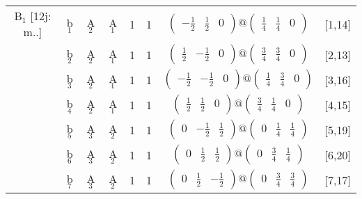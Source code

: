 \documentclass[fleqn,10pt,landscape]{article}
\begin{document}
\begin{itemize}
\begin{center}
\begin{longtable}{cc|cc|c|c|c|l}
B$_{1}$ [12j: m..] & b$_{1}$ & A$_{2}$ & A$_{1}$ & 1 & 1 & $\begin{pmatrix} - \frac{1}{2} & \frac{1}{2} & 0 \end{pmatrix}@\begin{pmatrix} \frac{1}{4} & \frac{1}{4} & 0 \end{pmatrix}$ & [1,14] \\
& b$_{2}$ & A$_{2}$ & A$_{1}$ & 1 & 1 & $\begin{pmatrix} \frac{1}{2} & - \frac{1}{2} & 0 \end{pmatrix}@\begin{pmatrix} \frac{3}{4} & \frac{3}{4} & 0 \end{pmatrix}$ & [2,13] \\
& b$_{3}$ & A$_{2}$ & A$_{1}$ & 1 & 1 & $\begin{pmatrix} - \frac{1}{2} & - \frac{1}{2} & 0 \end{pmatrix}@\begin{pmatrix} \frac{1}{4} & \frac{3}{4} & 0 \end{pmatrix}$ & [3,16] \\
& b$_{4}$ & A$_{2}$ & A$_{1}$ & 1 & 1 & $\begin{pmatrix} \frac{1}{2} & \frac{1}{2} & 0 \end{pmatrix}@\begin{pmatrix} \frac{3}{4} & \frac{1}{4} & 0 \end{pmatrix}$ & [4,15] \\
& b$_{5}$ & A$_{3}$ & A$_{2}$ & 1 & 1 & $\begin{pmatrix} 0 & - \frac{1}{2} & \frac{1}{2} \end{pmatrix}@\begin{pmatrix} 0 & \frac{1}{4} & \frac{1}{4} \end{pmatrix}$ & [5,19] \\
& b$_{6}$ & A$_{3}$ & A$_{2}$ & 1 & 1 & $\begin{pmatrix} 0 & \frac{1}{2} & \frac{1}{2} \end{pmatrix}@\begin{pmatrix} 0 & \frac{3}{4} & \frac{1}{4} \end{pmatrix}$ & [6,20] \\
& b$_{7}$ & A$_{3}$ & A$_{2}$ & 1 & 1 & $\begin{pmatrix} 0 & \frac{1}{2} & - \frac{1}{2} \end{pmatrix}@\begin{pmatrix} 0 & \frac{3}{4} & \frac{3}{4} \end{pmatrix}$ & [7,17] \\

\end{longtable}
\end{center}
\end{itemize}
\end{document}
